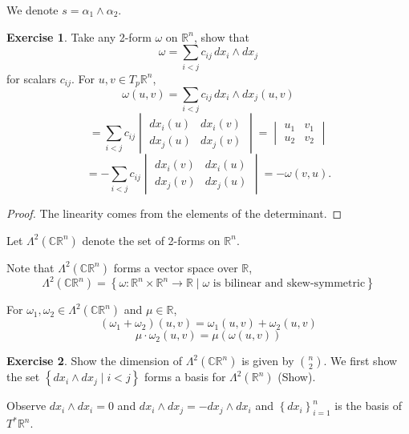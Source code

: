 \documentclass[11pt]{article}
\theoremstyle{definition}
\newtheorem{exercise}{Exercise}
\theoremstyle{remark}
\begin{document}
We denote $s = \alpha_1 \wedge \alpha_2$.

\begin{exercise}
Take any 2-form $\omega$ on $\mathbb{R}^n$, show that
\[
\omega = \sum_{i < j} c_{ij} \, dx_i \wedge dx_j
\]
for scalars $c_{ij}$. For $u, v \in T_p \mathbb{R}^n$,
\[
\omega(u, v) = \sum_{i < j} c_{ij} \, dx_i \wedge dx_j(u, v)
\]
\[
= \sum_{i < j} c_{ij} \begin{vmatrix}
dx_i(u) & dx_i(v) \\
dx_j(u) & dx_j(v)
\end{vmatrix}
= \begin{vmatrix}
u_1 & v_1 \\
u_2 & v_2
\end{vmatrix}
\]
\[
= -\sum_{i < j} c_{ij} \begin{vmatrix}
dx_i(v) & dx_i(u) \\
dx_j(v) & dx_j(u)
\end{vmatrix}
= -\omega(v, u).
\]

\begin{proof}
The linearity comes from the elements of the determinant.
\end{proof}
\end{exercise}

Let $\Lambda^2(\mathbb{C} \mathbb{R}^n)$ denote the set of 2-forms on $\mathbb{R}^n$.

Note that $\Lambda^2(\mathbb{C} \mathbb{R}^n)$ forms a vector space over $\mathbb{R}$,
\[
\Lambda^2(\mathbb{C} \mathbb{R}^n) = \left\{ \omega : \mathbb{R}^n \times \mathbb{R}^n \to \mathbb{R} \mid \omega \text{ is bilinear and skew-symmetric} \right\}
\]

For $\omega_1, \omega_2 \in \Lambda^2(\mathbb{C} \mathbb{R}^n)$ and $\mu \in \mathbb{R}$,
\[
(\omega_1 + \omega_2)(u, v) = \omega_1(u, v) + \omega_2(u, v)
\]
\[
\mu \cdot \omega_2(u, v) = \mu (\omega(u, v))
\]

\begin{exercise}
Show the dimension of $\Lambda^2(\mathbb{C} \mathbb{R}^n)$ is given by $\binom{n}{2}$. We first show the set $\left\{ dx_i \wedge dx_j \mid i < j \right\}$ forms a basis for $\Lambda^2(\mathbb{R}^n)$ (Show).

Observe $dx_i \wedge dx_i = 0$ and $dx_i \wedge dx_j = -dx_j \wedge dx_i$ and $\left\{ dx_i \right\}_{i=1}^n$ is the basis of $T^* \mathbb{R}^n$.
\end{exercise}
\end{document}
